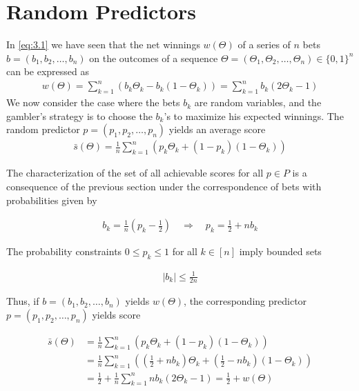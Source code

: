 \documentclass[11pt]{article}
\numberwithin{equation}{section}
\theoremstyle{boldStyle}
\begin{document}
\section{Random Predictors}
In \ref{eq:3.1} we have seen that the net winnings $w(\Theta)$ of a series of $n$ bets $b = (b_1, b_2, \ldots, b_n)$ 
on the outcomes of a sequence $\Theta = (\Theta_1, \Theta_2, \ldots, \Theta_n) \in \{0, 1\}^n$ can be expressed as
\begin{align*}
    w(\Theta) = \sum_{k=1}^n \left( b_k \Theta_k - b_k(1 - \Theta_k) \right)  = \sum_{k=1}^n b_k(2\Theta_k - 1)
\end{align*}
We now consider the case where the bets $b_k$ are random variables, and the gambler's strategy is to choose the $b_k$'s to maximize his expected winnings.
The random predictor $p = (p_1, p_2, \ldots, p_n)$ yields an average score 
\begin{align}
    \bar{s}(\Theta) = \frac{1}{n} \sum_{k=1}^{n} \left( p_k \Theta_k + (1 - p_k)(1 - \Theta_k) \right)
\end{align}

The characterization of the set of all achievable scores for all $p \in P$ is a consequence of the previous section 
under the correspondence of bets with probabilities given by 

\begin{align}
    b_k = \frac{1}{n} (p_k - \frac{1}{2}) \quad \Rightarrow \quad p_k = \frac{1}{2} + n b_k
\end{align}

The probability constraints $0 \leq p_k \leq 1$ for all $k \in [n]$ imply bounded sets 

\begin{align}
    \left| b_k \right| \leq \frac{1}{2n}
\end{align}

Thus, if $b = (b_1, b_2, \ldots, b_n)$ yields $w(\Theta)$, the corresponding predictor $p = (p_1, p_2, \ldots, p_n)$ yields score 

\begin{equation}
    \begin{aligned}
        \bar{s}(\Theta) &= \frac{1}{n} \sum_{k=1}^{n} \left( p_k \Theta_k + (1 - p_k)(1 - \Theta_k) \right) \\
            &= \frac{1}{n} \sum_{k=1}^{n} \left( (\frac{1}{2} + n b_k ) \Theta_k + (\frac{1}{2} - n b_k)(1 - \Theta_k) \right) \\ 
            &= \frac{1}{2} + \frac{1}{n} \sum_{k=1}^{n} n b_k(2 \Theta_k - 1) = \frac{1}{2} + w(\Theta)
    \end{aligned}
\end{equation}
\end{document}
